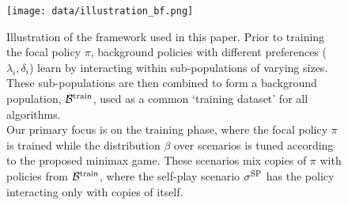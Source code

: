 \begin{figure}
    \centering
    \texttt{[image: data/illustration\_bf.png]}
    \caption{Illustration of the framework used in this paper. Prior to training the focal policy $\pi$, background policies with different preferences ($\lambda_i, \delta_i$) learn by interacting within sub-populations of varying sizes. These sub-populations are then combined to form a background population, $\mathcal{B}^\text{train}$, used as a common ‘training dataset’ for all algorithms.\\ 
    Our primary focus is on the training phase, where the focal policy $\pi$ is trained while the distribution $\beta$ over scenarios is tuned according to the proposed minimax game. These scenarios mix copies of $\pi$ with policies from $\mathcal{B}^\text{train}$, where the self-play scenario $\sigma^\text{SP}$ has the policy interacting only with copies of itself. }
    \label{fig:main_illustration}
\end{figure}
